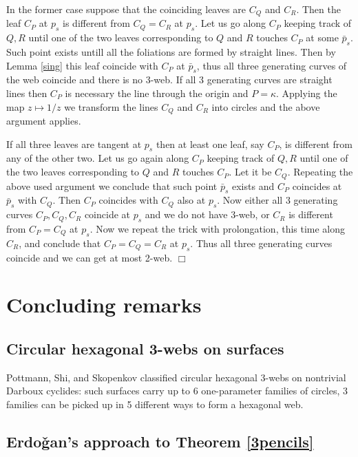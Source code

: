 \documentclass[11pt,a4paper]{article}
\begin{document}
In the former case suppose that  the coinciding leaves are $C_Q$ and $C_R$. Then the leaf $C_P$ at $p_s$ is different from $C_Q=C_R$ at $p_s$.  Let us go along $C_P$ keeping track of $Q,R$ until one of the two leaves corresponding to $Q$ and $R$ touches $C_P$ at some $\bar{p}_s$. Such point exists untill all the foliations are formed by straight lines. Then by Lemma \ref{sing} this leaf coincide with $C_P$ at $\bar{p}_s$, thus all three generating curves of the web coincide and there is no 3-web. If all 3 generating curves are straight lines then $C_P$ is necessary the line through the origin and $P=\kappa$. Applying the map $z\mapsto 1/z$ we transform the lines $C_Q$ and $C_R$ into circles and the above argument applies.  

If all three leaves are tangent at $p_s$ then at least one leaf, say $C_P$,  is different from any of the other two. Let us go again along $C_P$ keeping track of $Q,R$ until one of the two leaves corresponding to $Q$ and $R$ touches $C_P$. Let it be $C_Q$. Repeating the above used argument we conclude that such point $\bar{p}_s$ exists and $C_P$ coincides at $\bar{p}_s$ with  $C_Q$. Then $C_P$ coincides with $C_Q$ also at $p_s$. Now either all 3 generating curves $C_P,C_Q,C_R$ coincide at $p_s$ and we do not have 3-web, or $C_R$ is different from $C_P=C_Q$ at $p_s$. Now we repeat  the trick with prolongation, this time along $C_R$, and conclude that $C_P=C_Q=C_R$ at $p_s$. Thus all three generating curves coincide and we can get at most 2-web.  
\hfill $\Box$\\



 \section{Concluding remarks} 

\subsection{Circular hexagonal 3-webs on surfaces} 

Pottmann,  Shi, and  Skopenkov \cite{PSS-12} classified circular hexagonal 3-webs on nontrivial Darboux cyclides: such surfaces carry up to 6 one-parameter families of circles, 3 families can be picked up  in 5 different ways to form a hexagonal web.      
 
\subsection{Erdo\v{g}an's approach to Theorem  \ref{3pencils}}
\end{document}
